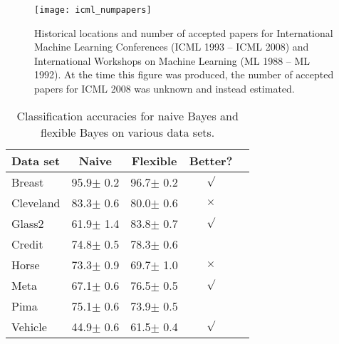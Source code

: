 \begin{figure}[ht]
    \vskip 0.2in
    \begin{center}
        \centerline{\texttt{[image: icml\_numpapers]}}
        \caption{Historical locations and number of accepted papers for International
        Machine Learning Conferences (ICML 1993 -- ICML 2008) and International
        Workshops on Machine Learning (ML 1988 -- ML 1992). At the time this figure was
        produced, the number of accepted papers for ICML 2008 was unknown and instead
        estimated.}
        \label{icml-historical}
    \end{center}
    \vskip -0.2in
\end{figure}

\begin{table}[t]
    \caption{Classification accuracies for naive Bayes and flexible
    Bayes on various data sets.}
    \label{sample-table}
    \vskip 0.15in
    \begin{center}
        \begin{small}
            \begin{sc}
            \begin{tabular}{lcccr}
                \toprule
                Data set & Naive & Flexible & Better? \\
                \midrule
                Breast    & 95.9$\pm$ 0.2& 96.7$\pm$ 0.2& $\surd$ \\
                Cleveland & 83.3$\pm$ 0.6& 80.0$\pm$ 0.6& $\times$\\
                Glass2    & 61.9$\pm$ 1.4& 83.8$\pm$ 0.7& $\surd$ \\
                Credit    & 74.8$\pm$ 0.5& 78.3$\pm$ 0.6&         \\
                Horse     & 73.3$\pm$ 0.9& 69.7$\pm$ 1.0& $\times$\\
                Meta      & 67.1$\pm$ 0.6& 76.5$\pm$ 0.5& $\surd$ \\
                Pima      & 75.1$\pm$ 0.6& 73.9$\pm$ 0.5&         \\
                Vehicle   & 44.9$\pm$ 0.6& 61.5$\pm$ 0.4& $\surd$ \\
                \bottomrule
            \end{tabular}
            \end{sc}
        \end{small}
    \end{center}
    \vskip -0.1in
\end{table}

